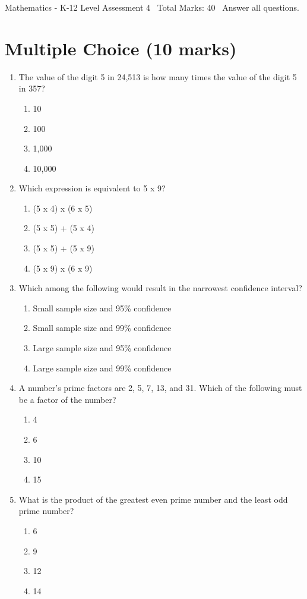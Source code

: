 \documentclass[12pt]{article}
\begin{document}
\begin{center}
Mathematics - K-12 Level Assessment 4 \
Total Marks: 40 \
Answer all questions.
\end{center}

\section*{Multiple Choice (10 marks)}
\begin{enumerate}[label=\arabic*.]
\item The value of the digit 5 in 24,513 is how many times the value of the digit 5 in 357?
\begin{enumerate}[label=(\alph*)]
    \item 10
    \item 100
    \item 1,000
    \item 10,000
\end{enumerate}
\item Which expression is equivalent to 5 x 9?
\begin{enumerate}[label=(\alph*)]
    \item (5 x 4) x (6 x 5)
    \item (5 x 5) + (5 x 4)
    \item (5 x 5) + (5 x 9)
    \item (5 x 9) x (6 x 9)
\end{enumerate}
\item Which among the following would result in the narrowest confidence interval?
\begin{enumerate}[label=(\alph*)]
    \item Small sample size and 95\% confidence
    \item Small sample size and 99\% confidence
    \item Large sample size and 95\% confidence
    \item Large sample size and 99\% confidence
\end{enumerate}
\item A number's prime factors are 2, 5, 7, 13, and 31. Which of the following must be a factor of the number?
\begin{enumerate}[label=(\alph*)]
    \item 4
    \item 6
    \item 10
    \item 15
\end{enumerate}
\item What is the product of the greatest even prime number and the least odd prime number?
\begin{enumerate}[label=(\alph*)]
    \item 6
    \item 9
    \item 12
    \item 14
\end{enumerate}
\end{enumerate}
\end{document}
